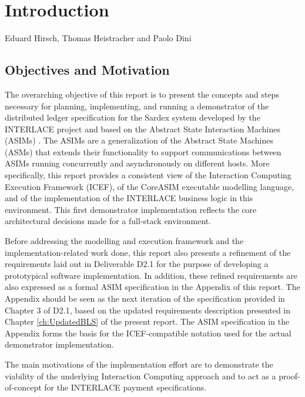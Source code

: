 \chapter{Introduction}
\label{ch:Introduction}

\vspace{-1cm}
\begin{center}
Eduard Hirsch, Thomas Heistracher and Paolo Dini
\end{center}


\section{Objectives and Motivation}
The overarching objective of this report is to present the concepts and steps necessary for planning, implementing, and running a demonstrator of the distributed ledger specification  for the Sardex system developed by the INTERLACE project and based on the Abstract State Interaction Machines (ASIMs) \cite{BIOMICSD42,BIOMICSD52}. The ASIMs are a generalization of the Abstract State Machines (ASMs) \cite{BoergerStaerk2003,BoergerRaschke2018} that extends their functionality to support communications between ASIMs running concurrently and asynchronously on different hosts. More specifically, this report provides a consistent view of the Interaction Computing Execution Framework (ICEF), of the CoreASIM executable modelling language, and of the implementation of the INTERLACE business logic in this environment. This first demonstrator implementation reflects the core architectural decisions made for a full-stack environment.

Before addressing the modelling and execution framework and the implementation-related work done, this report also presents a refinement of the requirements laid out in Deliverable D2.1 \cite{INTERLACE_D21} for the purpose of developing a prototypical software implementation. In addition, these refined requirements are also expressed as a formal ASIM specification in the Appendix of this report. The Appendix should be seen as the next iteration of the specification provided in Chapter 3 of D2.1, based on the updated requirements description presented in Chapter \ref{ch:UpdatedBLS} of the present report. The ASIM specification in the Appendix forms the basis for the ICEF-compatible notation used for the actual demonstrator implementation.

The main motivations of the implementation effort are to demonstrate the viability of the underlying Interaction Computing approach and to act as a proof-of-concept for the INTERLACE payment specifications.

